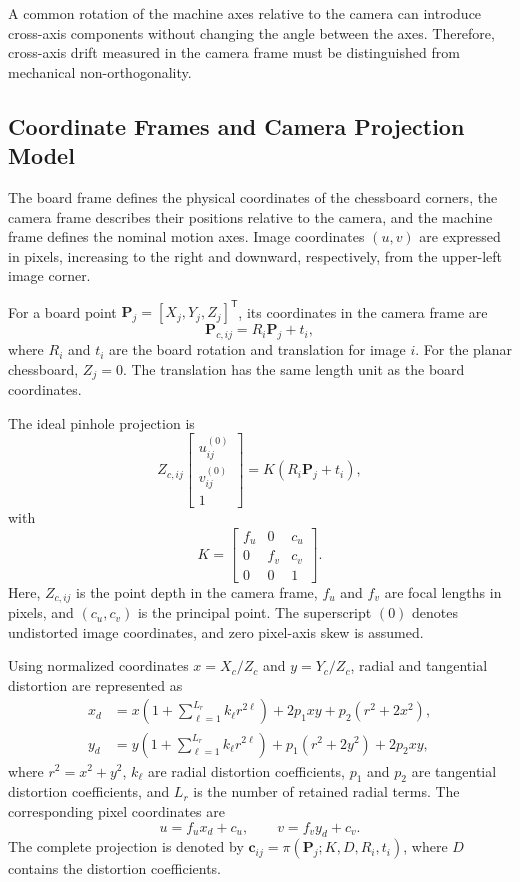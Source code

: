 \documentclass[journal]{IEEEtran}
\begin{document}
A common rotation of the machine axes relative
to the camera can introduce cross-axis components
without changing the angle between the axes.
Therefore, cross-axis drift measured in the camera
frame must be distinguished from mechanical
non-orthogonality.

\subsection{Coordinate Frames and Camera Projection Model}

The board frame defines the physical coordinates
of the chessboard corners, the camera frame describes
their positions relative to the camera, and the
machine frame defines the nominal motion axes.
Image coordinates $(u,v)$ are expressed in pixels,
increasing to the right and downward, respectively,
from the upper-left image corner.

For a board point
$\mathbf P_j=[X_j,Y_j,Z_j]^{\mathsf T}$,
its coordinates in the camera frame are
\begin{equation}
\label{eq:board_to_camera}
\mathbf P_{c,ij}
=
R_i\mathbf P_j+t_i,
\end{equation}
where $R_i$ and $t_i$ are the board rotation
and translation for image $i$.
For the planar chessboard, $Z_j=0$.
The translation has the same length unit as
the board coordinates.

The ideal pinhole projection is
\begin{equation}
\label{eq:pinhole_projection}
Z_{c,ij}
\begin{bmatrix}
u^{(0)}_{ij}\\
v^{(0)}_{ij}\\
1
\end{bmatrix}
=
K(R_i\mathbf P_j+t_i),
\end{equation}
with
\[
K=
\begin{bmatrix}
f_u & 0 & c_u\\
0 & f_v & c_v\\
0 & 0 & 1
\end{bmatrix}.
\]
Here, $Z_{c,ij}$ is the point depth in the camera
frame, $f_u$ and $f_v$ are focal lengths in pixels,
and $(c_u,c_v)$ is the principal point.
The superscript $(0)$ denotes undistorted image
coordinates, and zero pixel-axis skew is assumed.

Using normalized coordinates
$x=X_c/Z_c$ and $y=Y_c/Z_c$, radial and tangential
distortion are represented as
\begin{equation}
\label{eq:lens_distortion_model}
\begin{aligned}
x_d &=
x\left(1+\sum_{\ell=1}^{L_r}k_\ell r^{2\ell}\right)
+2p_1xy+p_2(r^2+2x^2),\\
y_d &=
y\left(1+\sum_{\ell=1}^{L_r}k_\ell r^{2\ell}\right)
+p_1(r^2+2y^2)+2p_2xy,
\end{aligned}
\end{equation}
where $r^2=x^2+y^2$, $k_\ell$ are radial
distortion coefficients, $p_1$ and $p_2$ are
tangential distortion coefficients, and $L_r$
is the number of retained radial terms.
The corresponding pixel coordinates are
\[
u=f_u x_d+c_u,
\qquad
v=f_v y_d+c_v.
\]
The complete projection is denoted by
$\mathbf c_{ij}=\pi(\mathbf P_j;K,D,R_i,t_i)$,
where $D$ contains the distortion coefficients.
\end{document}
